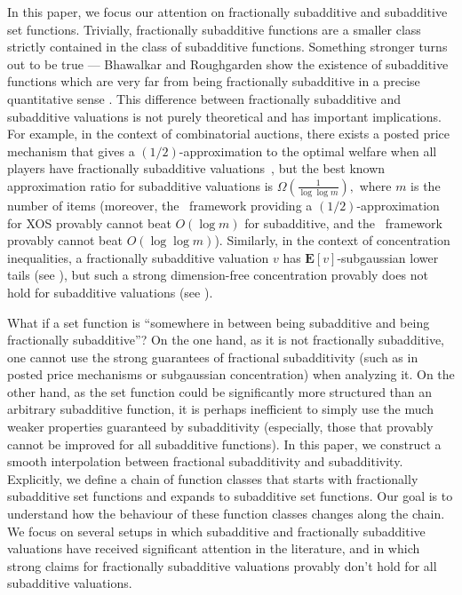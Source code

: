 \documentclass[11pt]{article}\usepackage{amsfonts}
\numberwithin{theorem}{subsection}
\newcommand{\expect}{\mathbf{E}}
\begin{document}
In this paper, we focus our attention on fractionally subadditive and subadditive set functions. Trivially, fractionally subadditive functions are a smaller class strictly contained in the class of subadditive functions. Something stronger turns out to be true --- Bhawalkar and Roughgarden show the existence of subadditive functions which are very far from being fractionally subadditive in a precise quantitative sense \cite{BhawalkarR11}. This difference between fractionally subadditive and subadditive valuations is not purely theoretical and has important implications. For example, in the context of combinatorial auctions, there exists a posted price mechanism that gives a $(1/2)$-approximation to the optimal welfare when all players have fractionally subadditive valuations~\cite{FeldmanGL15}, but the best known approximation ratio for subadditive valuations is $\Omega(\frac{1}{\log \log m}),$ where $m$ is the number of items \cite{DuttingKL20} (moreover, the~\cite{FeldmanGL15} framework providing a $(1/2)$-approximation for XOS provably cannot beat $O(\log m)$ for subadditive, and the~\cite{DuttingKL20} framework provably cannot beat $O(\log \log m)$). Similarly, in the context of concentration inequalities, a fractionally subadditive valuation $v$ has $\expect[v]$-subgaussian lower tails (see \cite[Corollary 3.2]{Vondrak10}), but such a strong dimension-free concentration provably does not hold for subadditive valuations (see \cite[Section 4]{Vondrak10}).

What if a set function is ``somewhere in between being subadditive and being fractionally subadditive''? On the one hand, as it is not fractionally subadditive, one cannot use the strong guarantees of fractional subadditivity (such as in posted price mechanisms or subgaussian concentration) when analyzing it. On the other hand, as the set function could be significantly more structured than an arbitrary subadditive function, it is perhaps inefficient to simply use the much weaker properties guaranteed by subadditivity (especially, those that provably cannot be improved for all subadditive functions). In this paper, we construct a smooth interpolation between fractional subadditivity and subadditivity. Explicitly, we define a chain of function classes that starts with fractionally subadditive set functions and expands to subadditive set functions. Our goal is to understand how the behaviour of these function classes changes along the chain. We focus on several setups in which subadditive and fractionally subadditive valuations have received significant attention in the literature, and in which strong claims for fractionally subadditive valuations provably don't hold for all subadditive valuations.
\end{document}

